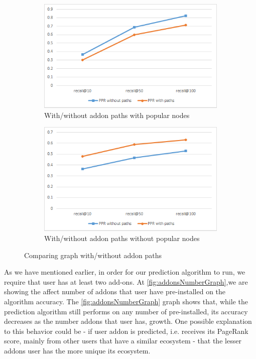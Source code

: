 \documentclass[11pt,oneside]{book}
\begin{document}
\begin{figure}[t]
\centering
\begin{subfigure}[b]{0.49\textwidth}
	\centering
\includegraphics[scale=0.49]{figures/minlen2noremoveCompPaths.png}
\caption{With/without addon paths with popular nodes}
\label{fig:with_without_paths_noremove}
\end{subfigure}
\begin{subfigure}[b]{0.49\textwidth}
	\centering
\includegraphics[scale=0.49]{figures/minlen5remove500CompPaths.png}
\caption{With/without addon paths without popular nodes}
\label{fig:with_without_paths_remove500}
\end{subfigure}
\caption{Comparing graph with/without addon paths}
	\label{fig:with_without_paths}
\end{figure}


As we have mentioned earlier, in order for our prediction algorithm to
run, we require that user has at least two add-ons. At
\autoref{fig:addonsNumberGraph},we are showing the affect number of
addons that user have pre-installed on the algorithm accuracy. The
\autoref{fig:addonsNumberGraph} graph shows that, while the prediction
algorithm still performs on any number of pre-installed, its accuracy
decreases as the number addons that user has, growth. One possible
explanation to this behavior could be - if user addon is predicted,
i.e. receives its PageRank score, mainly from other users that have a
similar ecosystem - that the lesser addons user has the more unique
its ecosystem.
\end{document}
